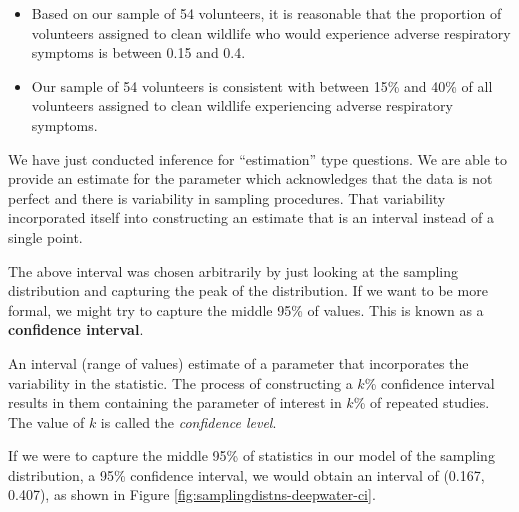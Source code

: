 \documentclass[]{book}
\providecommand{\tightlist}{%
  \setlength{\itemsep}{0pt}\setlength{\parskip}{0pt}}
\theoremstyle{plain}
\theoremstyle{mydefn}
\theoremstyle{myexmpl}
\theoremstyle{remark}
\let\BeginKnitrBlock\begin \let\EndKnitrBlock\end
\let\BeginKnitrBlock\begin \let\EndKnitrBlock\end
\begin{document}
\begin{itemize}
\tightlist
\item
  Based on our sample of 54 volunteers, it is reasonable that the
  proportion of volunteers assigned to clean wildlife who would
  experience adverse respiratory symptoms is between 0.15 and 0.4.
\item
  Our sample of 54 volunteers is consistent with between 15\% and 40\%
  of all volunteers assigned to clean wildlife experiencing adverse
  respiratory symptoms.
\end{itemize}

We have just conducted inference for ``estimation'' type questions. We
are able to provide an estimate for the parameter which acknowledges
that the data is not perfect and there is variability in sampling
procedures. That variability incorporated itself into constructing an
estimate that is an interval instead of a single point.

The above interval was chosen arbitrarily by just looking at the
sampling distribution and capturing the peak of the distribution. If we
want to be more formal, we might try to capture the middle 95\% of
values. This is known as a \textbf{confidence interval}.

\BeginKnitrBlock{definition}[Confidence Interval]
\protect\hypertarget{def:defn-confidence-interval}{}{\label{def:defn-confidence-interval}
{} }An interval (range of values)
estimate of a parameter that incorporates the variability in the
statistic. The process of constructing a \(k\)\% confidence interval
results in them containing the parameter of interest in \(k\)\% of
repeated studies. The value of \(k\) is called the \emph{confidence
level}.
\EndKnitrBlock{definition}

If we were to capture the middle 95\% of statistics in our model of the
sampling distribution, a 95\% confidence interval, we would obtain an
interval of (0.167, 0.407), as shown in Figure
\ref{fig:samplingdistns-deepwater-ci}.
\end{document}
